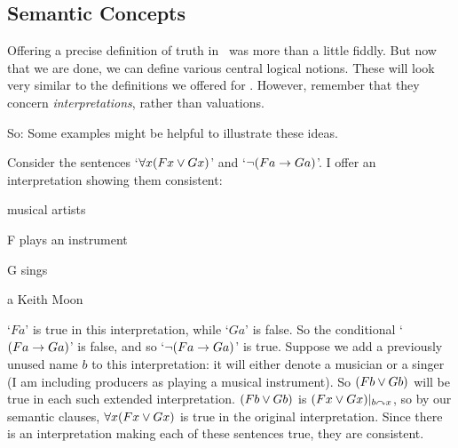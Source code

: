 \begin{earg}
\chapter{Semantic Concepts}\label{FOL.semantics}
Offering a precise definition of truth in \FOL\ was more than a little fiddly. But now that we are done, we can define various central logical notions. These will look very similar to the definitions we offered for \TFL. However, remember that they concern \emph{interpretations}, rather than valuations. 

So:
Some examples might be helpful to illustrate these ideas. 

 Consider the sentences ‘$\forall x(Fx \vee Gx)$’ and ‘$\neg(Fa \rightarrow Ga)$’. I offer an interpretation showing them consistent: \begin{ekey}
	\item[\text{Domain}] musical artists
	\item[F]  plays an instrument
	\item[G]  sings
	\item[a] Keith Moon
\end{ekey} ‘$Fa$’ is true in this interpretation, while ‘$Ga$’ is false. So the conditional `$(Fa \rightarrow Ga)$' is false, and so `$\neg(Fa \rightarrow Ga)$' is true. Suppose we add a previously unused name $b$ to this interpretation: it will either denote a musician or a singer (I am including producers as playing a musical instrument). So $(Fb \vee Gb)$ will be true in each such extended interpretation. $(Fb \vee Gb)$ is $(Fx \vee Gx)\vert_{b\curvearrowright x}$, so by our semantic clauses, $\forall x (Fx \vee Gx)$ is true in the original interpretation. Since there is an interpretation making each of these sentences true, they are consistent. 


\end{earg}
